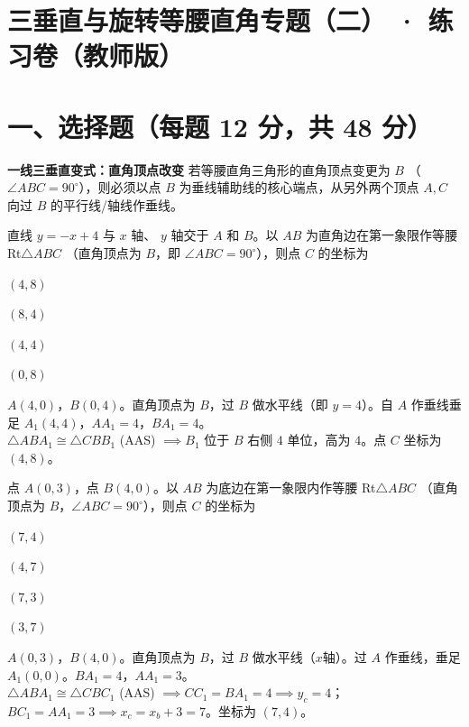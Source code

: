 \documentclass{exam-zh}
\begin{document}
\section*{三垂直与旋转等腰直角专题（二） · 练习卷（教师版）}

\section*{一、选择题（每题 12 分，共 48 分）}


\begin{keyideabox}
  \textbf{一线三垂直变式：直角顶点改变}
  若等腰直角三角形的直角顶点变更为 $B$ （$\angle ABC = 90^\circ$），则必须以点 $B$ 为垂线辅助线的核心端点，从另外两个顶点 $A, C$ 向过 $B$ 的平行线/轴线作垂线。
\end{keyideabox}



\begin{question}[points=12]
  直线 $y = -x + 4$ 与 $x$ 轴、 $y$ 轴交于 $A$ 和 $B$。以 $AB$ 为直角边在第一象限作等腰 Rt$\triangle ABC$ （直角顶点为 $B$，即 $\angle ABC = 90^\circ$），则点 $C$ 的坐标为
  \begin{choices}
    \item $(4, 8)$
    \item $(8, 4)$
    \item $(4, 4)$
    \item $(0, 8)$
  \end{choices}
  \paren[A]
  \begin{solutionblock}
    $A(4,0)$，$B(0,4)$。直角顶点为 $B$，过 $B$ 做水平线（即 $y=4$）。自 $A$ 作垂线垂足 $A_1(4,4)$，$AA_1 = 4$，$BA_1 = 4$。\\ $\triangle ABA_1 \cong \triangle CBB_1$ (AAS) $\implies B_1$ 位于 $B$ 右侧 $4$ 单位，高为 $4$。点 $C$ 坐标为 $(4, 8)$。
  \end{solutionblock}
\end{question}



\begin{question}[points=12]
  点 $A(0, 3)$，点 $B(4, 0)$。以 $AB$ 为底边在第一象限内作等腰 Rt$\triangle ABC$ （直角顶点为 $B$，$\angle ABC = 90^\circ$），则点 $C$ 的坐标为
  \begin{choices}
    \item $(7, 4)$
    \item $(4, 7)$
    \item $(7, 3)$
    \item $(3, 7)$
  \end{choices}
  \paren[A]
  \begin{solutionblock}
    $A(0,3)$，$B(4,0)$。直角顶点为 $B$，过 $B$ 做水平线（$x$轴）。过 $A$ 作垂线，垂足 $A_1(0,0)$。$BA_1 = 4$，$AA_1 = 3$。\\ $\triangle ABA_1 \cong \triangle CBC_1$ (AAS) $\implies CC_1 = BA_1 = 4 \implies y_c = 4$；$BC_1 = AA_1 = 3 \implies x_c = x_b + 3 = 7$。坐标为 $(7, 4)$。
  \end{solutionblock}
\end{question}
\end{document}
